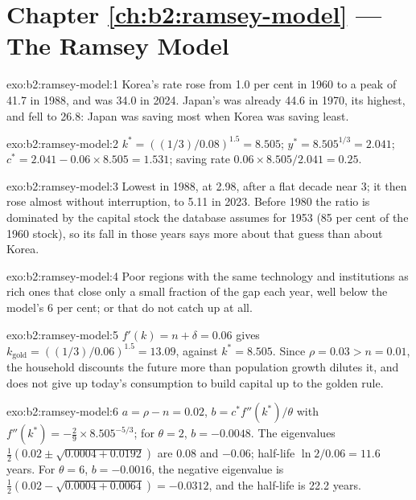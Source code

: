 \section*{Chapter \ref{ch:b2:ramsey-model} --- The Ramsey Model}

\begin{solution}{exo:b2:ramsey-model:1}
Korea's rate rose from 1.0 per cent in 1960 to a peak of 41.7 in 1988, and was 34.0 in 2024. Japan's was already 44.6 in 1970, its highest, and fell to 26.8: Japan
was saving most when Korea was saving least.
\end{solution}

\begin{solution}{exo:b2:ramsey-model:2}
$k^* = ((1/3)/0.08)^{1.5} = 8.505$; $y^* = 8.505^{1/3} = 2.041$; $c^* = 2.041 - 0.06 \times 8.505 = 1.531$; saving rate $0.06 \times 8.505/2.041 = 0.25$.
\end{solution}

\begin{solution}{exo:b2:ramsey-model:3}
Lowest in 1988, at 2.98, after a flat decade near 3; it then rose almost without interruption, to 5.11 in 2023. Before 1980
the ratio is dominated by the capital stock the database assumes for 1953 (85 per cent of the 1960 stock), so its fall in
those years says more about that guess than about Korea.
\end{solution}

\begin{solution}{exo:b2:ramsey-model:4}
Poor regions with the same technology and institutions as rich ones that close only a small fraction of the gap each
year, well below the model's 6 per cent; or that do not catch up at all.
\end{solution}

\begin{solution}{exo:b2:ramsey-model:5}
$f'(k) = n + \delta = 0.06$ gives $k_{\mathrm{gold}} = ((1/3)/0.06)^{1.5} = 13.09$, against $k^* = 8.505$. Since $\rho = 0.03 > n = 0.01$, the household discounts the future more than population growth
dilutes it, and does not give up today's consumption to build capital up to the golden rule.
\end{solution}

\begin{solution}{exo:b2:ramsey-model:6}
$a = \rho - n = 0.02$, $b = c^*f''(k^*)/\theta$ with $f''(k^*) = -\tfrac29 \times 8.505^{-5/3}$; for $\theta = 2$, $b = -0.0048$. The eigenvalues $\tfrac12(0.02 \pm \sqrt{0.0004 + 0.0192})$ are 0.08 and $-0.06$; half-life $\ln 2/0.06 = 11.6$ years. For $\theta = 6$,
$b = -0.0016$, the negative eigenvalue is $\tfrac12(0.02 - \sqrt{0.0004 + 0.0064}) = -0.0312$, and the half-life is 22.2 years.
\end{solution}

